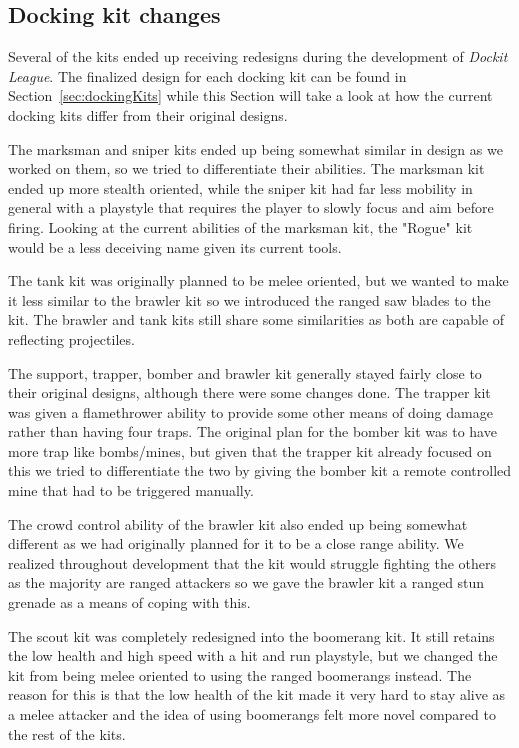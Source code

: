 \subsection{Docking kit changes}
Several of the kits ended up receiving redesigns during the development of \emph{Dockit League}. The finalized design for each docking kit can be found in Section~\ref{sec:dockingKits} while this Section will take a look at how the current docking kits differ from their original designs. 

The marksman and sniper kits ended up being somewhat similar in design as we worked on them, so we tried to differentiate their abilities. The marksman kit ended up more stealth oriented, while the sniper kit had far less mobility in general with a playstyle that requires the player to slowly focus and aim before firing. Looking at the current abilities of the marksman kit, the "Rogue" kit would be a less deceiving name given its current tools. 

The tank kit was originally planned to be melee oriented, but we wanted to make it less similar to the brawler kit so we introduced the ranged saw blades to the kit. The brawler and tank kits still share some similarities as both are capable of reflecting projectiles. 

The support, trapper, bomber and brawler kit generally stayed fairly close to their original designs, although there were some changes done. The trapper kit was given a flamethrower ability to provide some other means of doing damage rather than having four traps. The original plan for the bomber kit was to have more trap like bombs/mines, but given that the trapper kit already focused on this we tried to differentiate the two by giving the bomber kit a remote controlled mine that had to be triggered manually.

The crowd control ability of the brawler kit also ended up being somewhat different as we had originally planned for it to be a close range ability. We realized throughout development that the kit would struggle fighting the others as the majority are ranged attackers so we gave the brawler kit a ranged stun grenade as a means of coping with this. 
    
The scout kit was completely redesigned into the boomerang kit. It still retains the low health and high speed with a hit and run playstyle, but we changed the kit from being melee oriented to using the ranged boomerangs instead. The reason for this is that the low health of the kit made it very hard to stay alive as a melee attacker and the idea of using boomerangs felt more novel compared to the rest of the kits. 